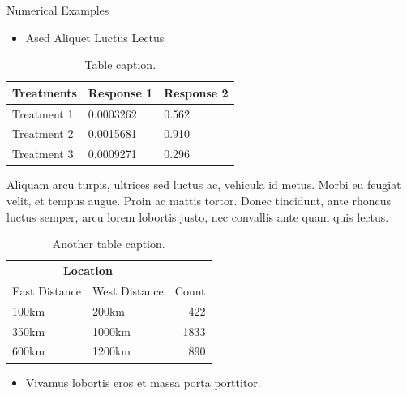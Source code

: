 \documentclass{beamer} %
\begin{document}
\begin{frame}[t]
\begin{columns}[t]
\begin{column}{0.465\textwidth} %


\begin{block}{Numerical Examples}
	\begin{itemize}
		\item Ased Aliquet Luctus Lectus
	\end{itemize}
	
	\begin{table}
		\caption{Table caption.}
		\begin{tabular}{l l l}
			\toprule
			\textbf{Treatments} & \textbf{Response 1} & \textbf{Response 2}\\
			\midrule
			Treatment 1 & 0.0003262 & 0.562 \\
			Treatment 2 & 0.0015681 & 0.910 \\
			Treatment 3 & 0.0009271 & 0.296 \\
			\bottomrule
		\end{tabular}
	\end{table}
	
	\bigskip\bigskip %
	
	Aliquam arcu turpis, ultrices sed luctus ac, vehicula id metus. Morbi eu feugiat velit, et tempus augue. Proin ac mattis tortor. Donec tincidunt, ante rhoncus luctus semper, arcu lorem lobortis justo, nec convallis ante quam quis lectus.
	
	\begin{table} %
		\caption{Another table caption.}
		\begin{tabular}{l l r}
			\toprule
			\multicolumn{2}{c}{\textbf{Location}} \\
			\cmidrule(r){1-2}
			East Distance & West Distance & Count \\
			\midrule
			100km & 200km & 422 \\
			350km & 1000km & 1833 \\
			600km & 1200km & 890 \\
			\bottomrule
		\end{tabular}
	\end{table}
	
	\bigskip\bigskip %
	
	\begin{itemize}
		\item Vivamus lobortis eros et massa porta porttitor.
	\end{itemize}
\end{block}


\end{column}
\end{columns}
\end{frame}
\end{document}
